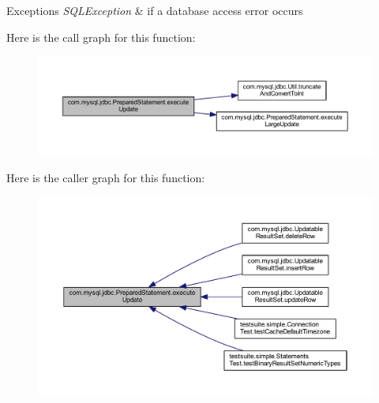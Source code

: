 \begin{DoxyExceptions}{Exceptions}
{\em S\+Q\+L\+Exception} & if a database access error occurs \\
\hline
\end{DoxyExceptions}
Here is the call graph for this function\+:
\nopagebreak
\begin{figure}[H]
\begin{center}
\leavevmode
\includegraphics[width=350pt]{classcom_1_1mysql_1_1jdbc_1_1_prepared_statement_a356cdeaae7b10fb79da4806e829a2190_cgraph}
\end{center}
\end{figure}
Here is the caller graph for this function\+:
\nopagebreak
\begin{figure}[H]
\begin{center}
\leavevmode
\includegraphics[width=350pt]{classcom_1_1mysql_1_1jdbc_1_1_prepared_statement_a356cdeaae7b10fb79da4806e829a2190_icgraph}
\end{center}
\end{figure}
\mbox{\label{classcom_1_1mysql_1_1jdbc_1_1_prepared_statement_a5f77388e9afc0a2fcb248732c3c91577}} 
